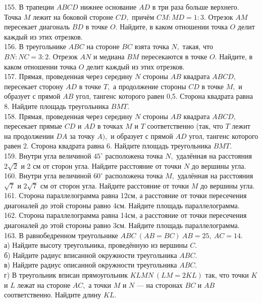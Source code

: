 \documentclass[12pt]{article}
\begin{document}
155. В трапеции $ABCD$ нижнее основание $AD$ в три раза больше верхнего. Точка $M$ лежит на боковой
стороне $CD,$ причём $CM:MD=1:3.$ Отрезок $AM$ пересекает диагональ $BD$ в точке $O.$ Найдите, в
каком отношении точка $O$ делит каждый из этих отрезков.\\
156. В треугольнике $ABC$ на стороне $BC$ взята точка $N,$ такая, что $BN : NC=3:2.$ Отрезок $AN$ и медиана
$BM$ пересекаются в точке $O.$ Найдите, в каком отношении точка $O$ делит каждый из этих отрезков.\\
157. Прямая, проведенная через середину $N$ стороны $AB$ квадрата $ABCD,$ пересекает сторону $AD$ в точке
$T,$ а продолжение стороны $CD$ в точке $M,$ и образует с прямой $AB$ угол, тангенс которого равен 0,5.
Сторона квадрата равна 8. Найдите площадь треугольника $BMT.$\\
158. Прямая, проведенная через середину $N$ стороны $AB$ квадрата $ABCD,$ пересекает прямые $CD$ и
$AD$ в точках $M$ и $T$ соответственно (так, что $T$ лежит на продолжении $DA$ за точку $A),$ и
образует с прямой $AD$ угол, тангенс которого равен 2. Сторона квадрата равна 6. Найдите площадь треугольника $BMT.$\\
159. Внутри угла величиной $45^\circ$ расположена точка $N,$ удалённая на расстояния $2\sqrt{2}$ и 2 см от сторон угла.
Найдите расстояние от точки $N$ до вершины угла.\\
160. Внутри угла величиной $60^\circ$ расположена точка $M,$ удалённая на расстояния $\sqrt{7}$ и $2\sqrt{7}$ см от
сторон угла. Найдите расстояние от точки $M$ до вершины угла.\\
161. Сторона параллелограмма равна 12см, а расстояние от точки пересечения диагоналей до этой стороны равно 4см. Найдите площадь параллелограмма.\\
162. Сторона параллелограмма равна 14см, а расстояние от точки пересечения диагоналей до этой стороны равно 3см. Найдите площадь параллелограмма.\\
163. В равнобедренном треугольнике $ABC\ (AB=BC)\ AB=25,\ AC=14.$\\
а) Найдите высоту треугольника, проведённую из вершины $C.$\\
б) Найдите радиус вписанной окружности треугольника $ABC.$\\
в) Найдите радиус описанной окружности треугольника $ABC.$\\
г) В треугольник вписан прямоугольник $KLMN\ (LM=2KL)$ так, что точки $K$ и $L$ лежат на стороне $AC,$ а точки $M$ и $N$ --- на сторонах $BC$ и $AB$ соответственно. Найдите длину $KL.$\\
\end{document}
